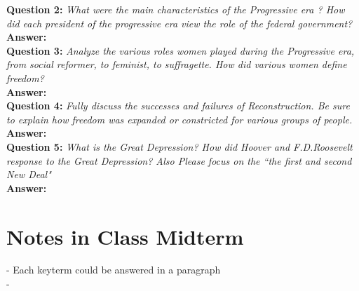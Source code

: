 \documentclass{article}
\begin{document}
\textbf{Question 2:} \textit{What were the main characteristics of the Progressive  era ? How did each president of the progressive era view the role of the federal government?}\\
\textbf{Answer:}       \\


\textbf{Question 3:} \textit{Analyze the various roles women played during the Progressive era, from
social reformer, to feminist, to suffragette. How did various women define freedom?}\\
\textbf{Answer:}       \\


\textbf{Question 4:} \textit{Fully discuss the successes and failures of Reconstruction. Be sure to explain how freedom was expanded or constricted for various groups of people.}\\
\textbf{Answer:}       \\



\textbf{Question 5:} \textit{What is the Great Depression? How did Hoover and F.D.Roosevelt response to the Great Depression? Also Please focus on the “the first and second New Deal"}\\
\textbf{Answer:}       \\


\section{Notes in Class Midterm}
- Each keyterm could be answered in a paragraph\\
- 
\end{document}
